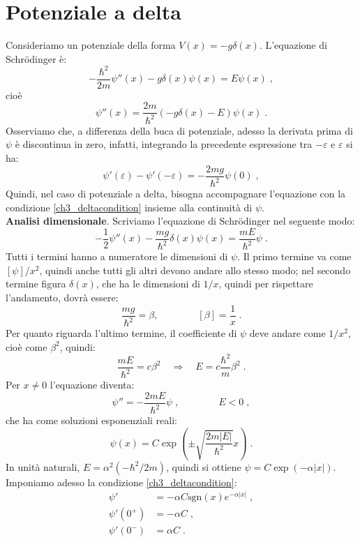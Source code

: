\documentclass[10pt,a4paper]{report}
\theoremstyle{definition}
\numberwithin{equation}{section}
\newcommand{\Sch}{Schrödinger}
\begin{document}
\section{Potenziale a delta}
Consideriamo un potenziale della forma $V(x)=-g\delta(x)$. L'equazione di \Sch\; è:
\begin{equation}
-\frac{\hbar^2}{2m}\psi''(x)-g\delta(x)\psi(x)=E\psi(x)\;,
\end{equation}
cioè
$$
\psi''(x)=\frac{2m}{\hbar^2}(-g\delta(x)-E)\psi(x)\;.
$$
Osserviamo che, a differenza della buca di potenziale, adesso la derivata prima di $\psi$ è discontinua in zero, infatti, integrando la precedente espressione tra $-\varepsilon$ e $\varepsilon$ si ha:
\begin{equation}
\psi'(\varepsilon)-\psi'(-\varepsilon)=-\frac{2mg}{\hbar^2}\psi(0)\;, \label{ch3_deltacondition}
\end{equation}
Quindi, nel caso di potenziale a delta, bisogna accompagnare l'equazione con la condizione \eqref{ch3_deltacondition} insieme alla continuità di $\psi$. \\
\textbf{Analisi dimensionale}. Scriviamo l'equazione di \Sch\; nel seguente modo:
\begin{equation}
-\frac{1}{2}\psi''(x)-\frac{mg}{\hbar^2}\delta(x)\psi(x)=\frac{mE}{\hbar^2}\psi\;.
\end{equation}
Tutti i termini hanno a numeratore le dimensioni di $\psi$. Il primo termine va come $[\psi]/x^2$, quindi anche tutti gli altri devono andare allo stesso modo; nel secondo termine figura $\delta(x)$, che ha le dimensioni di $1/x$, quindi per rispettare l'andamento, dovrà essere:
\begin{equation}
\frac{mg}{\hbar^2}=\beta, \qquad \qquad [\beta]=\frac{1}{x}\;.
\end{equation}
Per quanto riguarda l'ultimo termine, il coefficiente di $\psi$ deve andare come $1/x^2$, cioè come $\beta^2$, quindi:
\begin{equation}
\frac{mE}{\hbar^2}=c\beta^2\quad  \Longrightarrow\quad  E=c\frac{\hbar^2}{m}\beta^2\;.
\end{equation}
Per $x\ne 0$ l'equazione diventa:
$$
\psi''=-\frac{2mE}{\hbar^2}\psi\;,\qquad\qquad E<0\;,
$$
che ha come soluzioni esponenziali reali:
$$
\psi(x)=C\exp\left(\pm\sqrt{\frac{2m|E|}{\hbar^2}} x\right)\;.
$$
In unità naturali, $E=\alpha^2(-\hbar^2/2m)$, quindi si ottiene $\psi=C\exp(-\alpha|x|)$. Imponiamo adesso la condizione \eqref{ch3_deltacondition}:
\begin{align*}
\psi' &=-\alpha C\mathrm{sgn}(x)e^{-\alpha|x|}\;, \\
\psi'(0^+) &= -\alpha C\;, \\
\psi'(0^-) &= \alpha C\;.
\end{align*}
\end{document}
